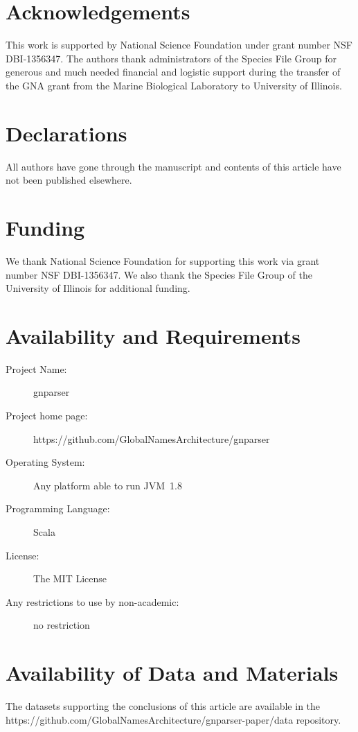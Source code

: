 \documentclass{bmcart}
\begin{document}
\section*{Acknowledgements}

This work is supported by National Science Foundation under grant number NSF DBI-1356347. The authors thank administrators of the Species File Group for generous and much needed financial and logistic support during the transfer of the GNA grant from the Marine Biological Laboratory to University of Illinois.

\section*{Declarations}

All authors have gone through the manuscript and contents of this article have
not been published elsewhere.

\section*{Funding}

We thank National Science Foundation for supporting this work via grant number NSF DBI-1356347. We also thank the Species File Group of the University of Illinois for additional funding.

\section*{Availability and Requirements}

\begin{description}
  \item[Project Name:] gnparser
  \item[Project home page:] https://github.com/GlobalNamesArchitecture/gnparser
  \item[Operating System:] Any platform able to run JVM~1.8
  \item[Programming Language:] Scala
  \item[License:] The MIT License
  \item[Any restrictions to use by non-academic:] no restriction
\end{description}

\section*{Availability of Data and Materials}
The datasets supporting the conclusions of this article are available in the  https://github.com/GlobalNamesArchitecture/gnparser-paper/data repository.
\end{document}
